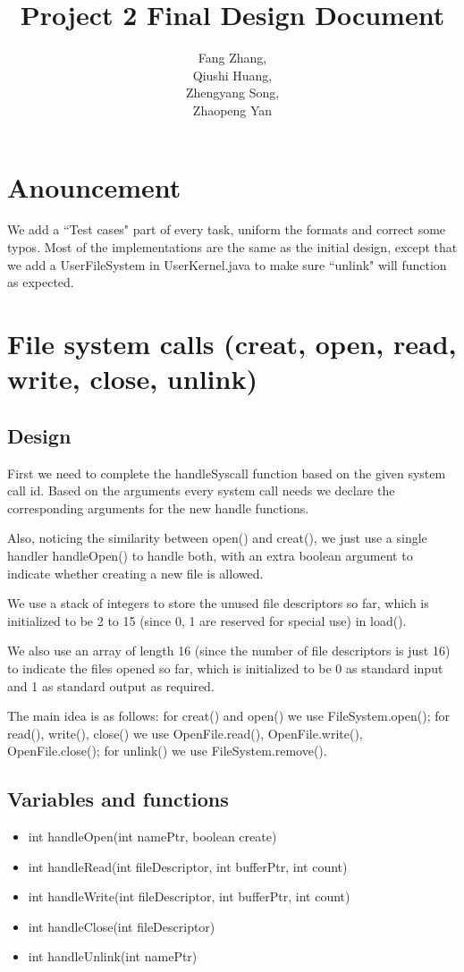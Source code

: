 \documentclass[a4paper,10pt]{article}
\title{Project 2 Final Design Document}
\author{Fang Zhang,\\
Qiushi Huang,\\
Zhengyang Song,\\
Zhaopeng Yan
}
\begin{document}
\maketitle

\section{Anouncement}

We add a ``Test cases" part of every task, uniform the formats and correct some typos. Most of the implementations are the same as the initial design, except that we add a UserFileSystem in UserKernel.java to make sure ``unlink"  will function as expected.

\section{File system calls (creat, open, read, write, close, unlink)}

\subsection{Design}

First we need to complete the handleSyscall function based on the given system call id. Based on the arguments every system call needs we declare the corresponding arguments for the new handle functions.

Also, noticing the similarity between open() and creat(), we just use a single handler handleOpen() to handle both, with an extra boolean argument to indicate whether creating a new file is allowed.

We use a stack of integers to store the unused file descriptors so far, which is initialized to be 2 to 15 (since 0, 1 are reserved for special use) in load().

We also use an array of length 16 (since the number of file descriptors is just 16) to indicate the files opened so far, which is initialized to be 0 as standard input and 1 as standard output as required.

The main idea is as follows: for creat() and open() we use FileSystem.open(); for read(), write(), close() we use OpenFile.read(), OpenFile.write(), OpenFile.close(); for unlink() we use FileSystem.remove().

\subsection{Variables and functions}
\begin{itemize}
\item int handleOpen(int namePtr, boolean create)
\item int handleRead(int fileDescriptor, int bufferPtr, int count)
\item int handleWrite(int fileDescriptor, int bufferPtr, int count)
\item int handleClose(int fileDescriptor)
\item int handleUnlink(int namePtr)
\end{itemize}
\end{document}
